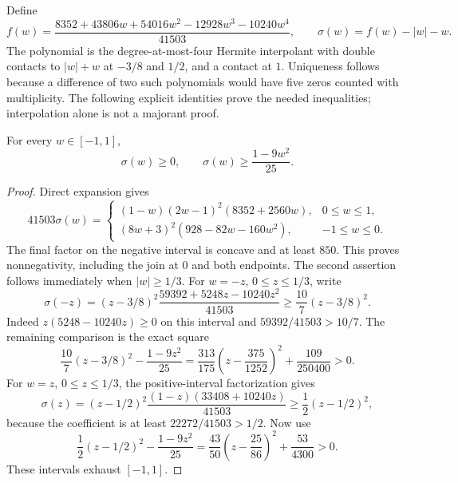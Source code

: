 Define
\[
 f(w)=\frac{8352+43806w+54016w^2-12928w^3-10240w^4}{41503},
 \qquad \sigma(w)=f(w)-|w|-w.
\]
The polynomial is the degree-at-most-four Hermite interpolant with double
contacts to $|w|+w$ at $-3/8$ and $1/2$, and a contact at $1$.
Uniqueness follows because a difference of two such polynomials would have
five zeros counted with multiplicity. The following explicit identities prove
the needed inequalities; interpolation alone is not a majorant proof.
\begin{lemma}\label{scalar}
For every $w\in[-1,1]$,
\begin{equation}\label{sigmapoint}
 \sigma(w)\ge0,\qquad \sigma(w)\ge\frac{1-9w^2}{25}.
\end{equation}
\end{lemma}
\begin{proof}
Direct expansion gives
\[
 41503\sigma(w)=
 \begin{cases}
 (1-w)(2w-1)^2(8352+2560w),&0\le w\le1,\\
 (8w+3)^2(928-82w-160w^2),&-1\le w\le0.
 \end{cases}
\]
The final factor on the negative interval is concave and at least $850$.
This proves nonnegativity, including the join at $0$ and both endpoints.
The second assertion follows immediately when $|w|\ge1/3$.
For $w=-z$, $0\le z\le1/3$, write
\[
 \sigma(-z)=(z-3/8)^2
          \frac{59392+5248z-10240z^2}{41503}
       \ge\frac{10}{7}(z-3/8)^2.
\]
Indeed $z(5248-10240z)\ge0$ on this interval and
$59392/41503>10/7$. The remaining comparison is the exact square
\[
 \frac{10}{7}(z-3/8)^2-\frac{1-9z^2}{25}
  =\frac{313}{175}\left(z-\frac{375}{1252}\right)^2
                         +\frac{109}{250400}>0.
\]
For $w=z$, $0\le z\le1/3$, the positive-interval factorization gives
\[
 \sigma(z)=(z-1/2)^2\frac{(1-z)(33408+10240z)}{41503}
              \ge\frac12(z-1/2)^2,
\]
because the coefficient is at least $22272/41503>1/2$. Now use
\[
 \frac12(z-1/2)^2-\frac{1-9z^2}{25}
   =\frac{43}{50}\left(z-\frac{25}{86}\right)^2+\frac{53}{4300}>0.
\]
These intervals exhaust $[-1,1]$.
\end{proof}


